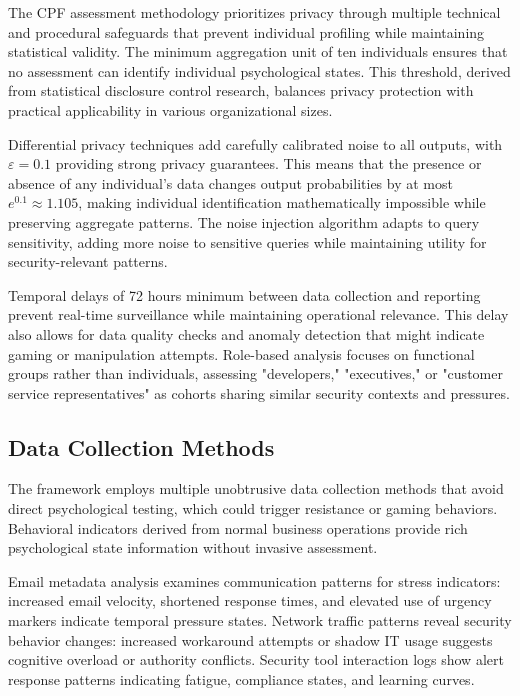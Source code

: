 \documentclass[11pt,a4paper]{article}
\begin{document}
The CPF assessment methodology prioritizes privacy through multiple technical and procedural safeguards that prevent individual profiling while maintaining statistical validity. The minimum aggregation unit of ten individuals ensures that no assessment can identify individual psychological states. This threshold, derived from statistical disclosure control research, balances privacy protection with practical applicability in various organizational sizes.

Differential privacy techniques add carefully calibrated noise to all outputs, with $\varepsilon = 0.1$ providing strong privacy guarantees. This means that the presence or absence of any individual's data changes output probabilities by at most $e^{0.1} \approx 1.105$, making individual identification mathematically impossible while preserving aggregate patterns. The noise injection algorithm adapts to query sensitivity, adding more noise to sensitive queries while maintaining utility for security-relevant patterns.

Temporal delays of 72 hours minimum between data collection and reporting prevent real-time surveillance while maintaining operational relevance. This delay also allows for data quality checks and anomaly detection that might indicate gaming or manipulation attempts. Role-based analysis focuses on functional groups rather than individuals, assessing "developers," "executives," or "customer service representatives" as cohorts sharing similar security contexts and pressures.

\subsection{Data Collection Methods}

The framework employs multiple unobtrusive data collection methods that avoid direct psychological testing, which could trigger resistance or gaming behaviors. Behavioral indicators derived from normal business operations provide rich psychological state information without invasive assessment.

Email metadata analysis examines communication patterns for stress indicators: increased email velocity, shortened response times, and elevated use of urgency markers indicate temporal pressure states. Network traffic patterns reveal security behavior changes: increased workaround attempts or shadow IT usage suggests cognitive overload or authority conflicts. Security tool interaction logs show alert response patterns indicating fatigue, compliance states, and learning curves.
\end{document}
